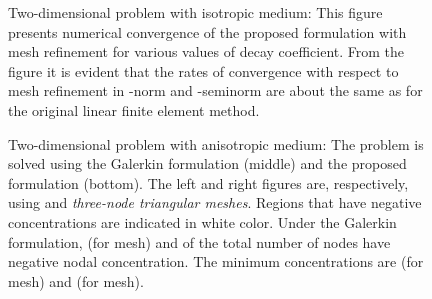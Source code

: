 \documentclass[11pt]{amsart}
\begin{document}
\begin{figure}[!h]
  \centering
\caption{Two-dimensional problem with isotropic medium: This figure presents numerical 
  convergence of the proposed formulation with mesh refinement for various values of decay 
  coefficient. From the figure it is evident that the rates of convergence with respect to mesh 
  refinement in -norm and -seminorm are about the same as for the original 
  linear finite element method.} \label{Fig:Decay_error_convergence_2D}
\end{figure}

\clearpage
\newpage

\begin{figure}
  \centering
\caption{Two-dimensional problem with anisotropic medium: The problem is solved using the 
    Galerkin formulation (middle) and the proposed formulation (bottom). The left and right 
    figures are, respectively, using  and  \emph{three-node 
      triangular meshes}. Regions that have negative concentrations are indicated in white 
    color. Under the Galerkin formulation,  (for  mesh) and  
    of the total number of nodes have negative nodal concentration. The minimum concentrations 
    are  (for  mesh) and  (for  mesh).}
  \label{Fig:Decay_2D_anisotropic_T3}
\end{figure}
\end{document}
